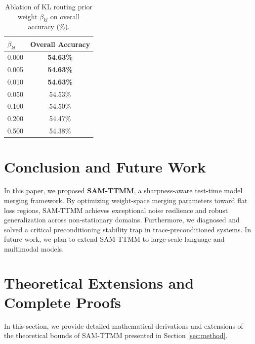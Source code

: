 \documentclass{article}
\theoremstyle{plain}
\theoremstyle{definition}
\theoremstyle{remark}
\begin{document}
\begin{table}[h]
\caption{Ablation of KL routing prior weight $\beta_{kl}$ on overall accuracy (\%).}
\label{tab:ablation_kl}
\vskip 0.15in
\begin{center}
\begin{small}
\begin{sc}
\begin{tabular}{lc}
\toprule
$\beta_{kl}$ & Overall Accuracy \\
\midrule
0.000 & \textbf{54.63\%} \\
0.005 & \textbf{54.63\%} \\
0.010 & \textbf{54.63\%} \\
0.050 & 54.53\% \\
0.100 & 54.50\% \\
0.200 & 54.47\% \\
0.500 & 54.38\% \\
\bottomrule
\end{tabular}
\end{sc}
\end{small}
\end{center}
\vskip -0.1in
\end{table}

\section{Conclusion and Future Work}
In this paper, we proposed \textbf{SAM-TTMM}, a sharpness-aware test-time model merging framework. By optimizing weight-space merging parameters toward flat loss regions, SAM-TTMM achieves exceptional noise resilience and robust generalization across non-stationary domains. Furthermore, we diagnosed and solved a critical preconditioning stability trap in trace-preconditioned systems. In future work, we plan to extend SAM-TTMM to large-scale language and multimodal models.



\nocite{*}

\newpage
\appendix
\onecolumn
\section{Theoretical Extensions and Complete Proofs}
\label{app:theory}
In this section, we provide detailed mathematical derivations and extensions of the theoretical bounds of SAM-TTMM presented in Section \ref{sec:method}.
\end{document}
